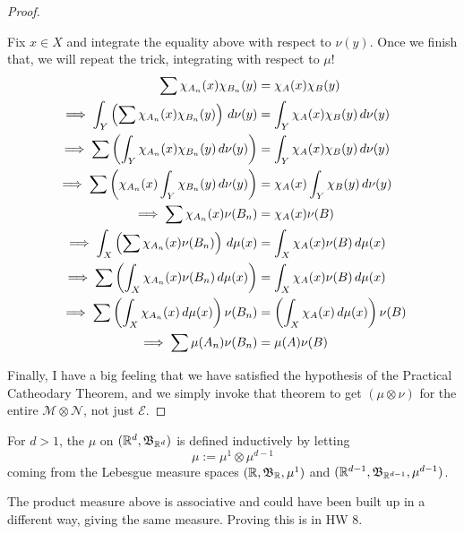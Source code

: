 \documentclass[11pt,leqno,oneside]{amsbook}
\numberwithin{thm}{section}
\newcommand{\M}{\mathcal{M}} %
\newcommand{\E}{\mathcal{E}}
\newcommand{\cN}{\mathcal{N}}
\newcommand{\ox}{\otimes}
\begin{document}
\begin{proof}
\begin{enumerate}[label=(\arabic{*})]
\begin{itemize}
      Fix $x \in X$ and integrate the equality above with respect to
      $\nu(y)$.  Once we finish that, we will repeat the trick, integrating with respect to $\mu$!
      \begin{align*}
        \sum \chi_{A_n}(x)\chi_{B_n}(y) &= \chi_A(x)\chi_B(y) \\
        \implies \int_Y\left(\sum \chi_{A_n}(x)\chi_{B_n}(y)\right)\, d\nu(y) &= \int_Y \chi_A(x)\chi_B(y) \, d\nu(y) \\
        \implies \sum \left(\int_Y\chi_{A_n}(x)\chi_{B_n}(y)\, d\nu(y)\right) &= \int_Y \chi_A(x)\chi_B(y) \, d\nu(y) \\
        \implies \sum \left(\chi_{A_n}(x)\int_Y\chi_{B_n}(y)\, d\nu(y)\right) &= \chi_A(x)\int_Y \chi_B(y) \, d\nu(y) \\
        \implies \sum \chi_{A_n}(x)\nu(B_n) &= \chi_A(x)\nu(B) \\
        \implies \int_X \left(\sum \chi_{A_n}(x)\nu(B_n)\right) \, d\mu(x) &= \int_X \chi_A(x)\nu(B)\, d\mu(x) \\
        \implies \sum \left(\int_X \chi_{A_n}(x)\nu(B_n) \, d\mu(x)\right) &= \int_X \chi_A(x)\nu(B)\, d\mu(x) \\
        \implies \sum \left(\int_X \chi_{A_n}(x) \, d\mu(x)\right)\nu(B_n) &= \left(\int_X \chi_A(x)\, d\mu(x)\right)\nu(B) \\
        \implies \sum \mu(A_n)\nu(B_n) &= \mu(A)\nu(B)
      \end{align*}
    \end{itemize}
  \end{enumerate}
  Finally, I have a big feeling that we have satisfied the hypothesis of the Practical Catheodary Theorem, and we simply invoke that theorem to get $(\mu\ox\nu)$ for the entire $\M\ox\cN$, not just $\E$.
\end{proof}
\begin{defn}
  For $d > 1$, the  $\mu$ on $({\mathbb R}^d, \mathfrak{B}_{{\mathbb R}^d})$ is defined inductively by letting $$\mu := \mu^1 \ox \mu^{d-1}$$ coming from the Lebesgue measure spaces $({\mathbb R}, \mathfrak{B}_{{\mathbb R}}, \mu^1)$ and $({\mathbb R}^{d-1}, \mathfrak{B}_{{\mathbb R}^{d-1}}, \mu^{d-1})$.
\end{defn}
\begin{thm}
  The product measure above is associative and could have been built up in a different way, giving the same measure.  Proving this is in HW 8.
\end{thm}
\end{document}
